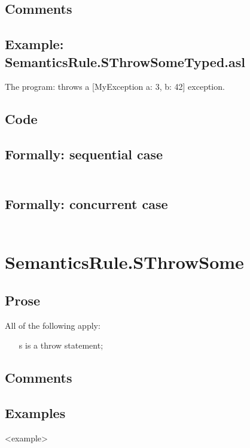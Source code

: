 \documentclass{book}
\begin{document}
    \subsection{Comments}

    \subsection{Example: SemanticsRule.SThrowSomeTyped.asl}
    The program:
    throws a [MyException {a: 3, b: 42}] exception.

  \subsection{Code}

  \subsection{Formally: sequential case}
  \begin{align}
  \end{align} 

  \subsection{Formally: concurrent case}
  \begin{align}
  \end{align} 

\section{SemanticsRule.SThrowSome \label{sec:SemanticsRule.SThrowSome}}

    \subsection{Prose}
    All of the following apply:
    \begin{itemize}
    \item [s] is a throw statement;
    \end{itemize}

    \subsection{Comments}

    \subsection{Examples}
    <example>
\end{document}
